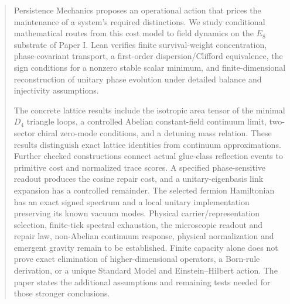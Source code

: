 \begin{abstract}
Persistence Mechanics proposes an operational action that prices the maintenance of a system's required distinctions. We study conditional mathematical routes from this cost model to field dynamics on the $E_8$ substrate of Paper I. Lean verifies finite survival-weight concentration, phase-covariant transport, a first-order dispersion/Clifford equivalence, the sign conditions for a nonzero stable scalar minimum, and finite-dimensional reconstruction of unitary phase evolution under detailed balance and injectivity assumptions.

The concrete lattice results include the isotropic area tensor of the minimal $D_4$ triangle loops, a controlled Abelian constant-field continuum limit, two-sector chiral zero-mode conditions, and a detuning mass relation. These results distinguish exact lattice identities from continuum approximations. Further checked constructions connect actual glue-class reflection events to primitive cost
and normalized trace scores. A specified phase-sensitive readout produces the cosine repair
cost, and a unitary-eigenbasis link expansion has a controlled remainder. The selected
fermion Hamiltonian has an exact signed spectrum and a local unitary implementation preserving
its known vacuum modes. Physical carrier/representation selection, finite-tick spectral
exhaustion, the microscopic readout and repair law, non-Abelian continuum response, physical
normalization and emergent gravity remain to be established. Finite capacity alone does not prove exact elimination of higher-dimensional operators, a Born-rule derivation, or a unique Standard Model and Einstein--Hilbert action. The paper states the additional assumptions and remaining tests needed for those stronger conclusions.
\end{abstract}
